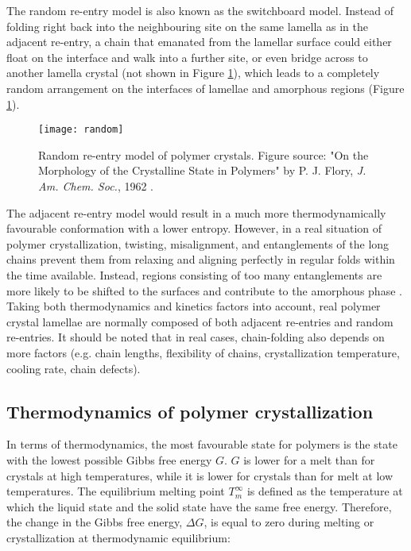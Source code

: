 The random re-entry model is also known as the switchboard model. Instead of folding right back into the neighbouring site on the same lamella as in the adjacent re-entry, a chain that emanated from the lamellar surface could either float on the interface and walk into a further site, or even bridge across to another lamella crystal (not shown in Figure \ref{fig:random}), which leads to a completely random arrangement on the interfaces of lamellae and amorphous regions (Figure \ref{fig:random}).

\begin{figure}[H]
\center
\texttt{[image: random]}
\caption[Random re-entry model of polymer crystals.]{Random re-entry model of polymer crystals. Figure source: "On the Morphology of the Crystalline State in Polymers" by P. J. Flory, \textit{J. Am. Chem. Soc.}, 1962 \cite{Flory1962}.}
\label{fig:random}
\end{figure}

The adjacent re-entry model would result in a much more thermodynamically favourable conformation with a lower entropy. However, in a real situation of polymer crystallization, twisting, misalignment, and entanglements of the long chains prevent them from relaxing and aligning perfectly in regular folds within the time available. Instead, regions consisting of too many entanglements are more likely to be shifted to the surfaces and contribute to the amorphous phase \cite{Strobl2007a}. Taking both thermodynamics and kinetics factors into account, real polymer crystal lamellae are normally composed of both adjacent re-entries and random re-entries. It should be noted that in real cases, chain-folding also depends on more factors (e.g. chain lengths, flexibility of chains, crystallization temperature, cooling rate, chain defects).
 
\subsection{Thermodynamics of polymer crystallization} \label{Thermodynamics of polymer crystallization}

In terms of thermodynamics, the most favourable state for polymers is the state with the lowest possible Gibbs free energy $G$. $G$ is lower for a melt than for crystals at high temperatures, while it is lower for crystals than for melt at low temperatures. The equilibrium melting point $T_{m}^{\infty}$ is defined as the temperature at which the liquid state and the solid state have the same free energy. Therefore, the change in the Gibbs free energy, $\Delta G$, is equal to zero during melting or crystallization at thermodynamic equilibrium:

